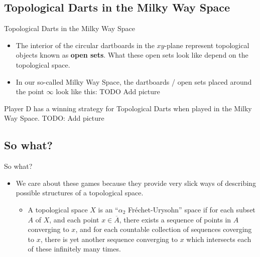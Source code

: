 \documentclass{beamer}
\begin{document}
\subsection{Topological Darts in the Milky Way Space}

\begin{frame}{Topological Darts in the Milky Way Space}
  
  \begin{itemize}
    \item
      The interior of the circular dartboards in the $xy$-plane represent topological objects known as \textbf{open sets}. What these open sets look like depend on the topological space.
    \pause
    \item
      In our so-called Milky Way Space, the dartboards / open sets placed around the point $\infty$ look like this: TODO Add picture
  \end{itemize}

\end{frame}

\begin{frame}
  
  Player D has a winning strategy for Topological Darts when played in the Milky Way Space. TODO: Add picture

\end{frame}

\subsection{So what?}

\begin{frame}{So what?}
  \begin{itemize}
    \item
      We care about these games because they provide very slick ways of describing possible structures of a topological space.
    \pause
      \begin{itemize}
        \item
          A topological space $X$ is an ``$\alpha_2$ Fr\'echet-Urysohn'' space if for each subset $A$ of $X$, and each point $x \in \overline{A}$, there exists a sequence of points in $A$ converging to $x$, and for each countable collection of sequences coverging to $x$, there is yet another sequence converging to $x$ which intersects each of these infinitely many times.
      \end{itemize}
  \end{itemize}
\end{frame}
\end{document}
